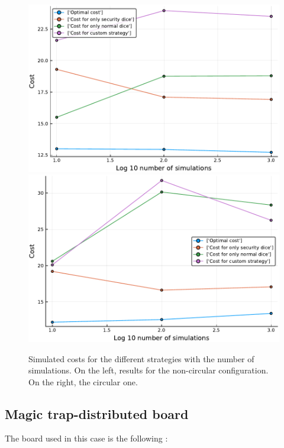 \begin{figure}[H]
\centering
\includegraphics[scale=0.41]{../img/board_left_high/cost_subopt_log_noncirc.pdf}
\includegraphics[scale=0.41]{../img/board_left_high/cost_subopt_log_circ.pdf}
\caption{Simulated costs for the different strategies with the number of simulations. On the left, results for the non-circular configuration. On the right, the circular one.}
\label{fig:cost_subopt_log_left}
\end{figure}

\subsection{Magic trap-distributed board}

The board used in this case is the following :

